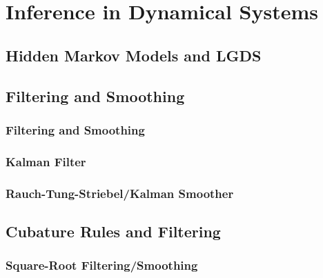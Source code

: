 \chapter{Inference in Dynamical Systems}
\label{c:inferenceInDynamicalSystems}




\section{Hidden Markov Models and LGDS}


\section{Filtering and Smoothing}
	\subsection{Filtering and Smoothing}

	\subsection{Kalman Filter}

	\subsection{Rauch-Tung-Striebel/Kalman Smoother}

\section{Cubature Rules and Filtering}

	\subsection{Square-Root Filtering/Smoothing}

